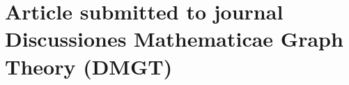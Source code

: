 \newpage


\section{Article submitted to journal  Discussiones Mathematicae Graph Theory (DMGT)} 
%

